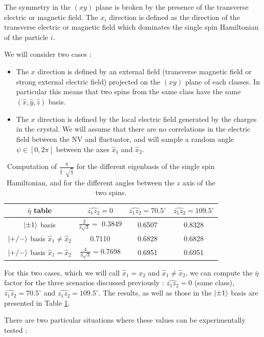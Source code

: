 \documentclass[preprintnumbers,amsmath,amssymb,onecolumn,12pt]{revtex4-2}\usepackage{graphicx}%
\begin{document}
The symmetry in the $(xy)$ plane is broken by the presence of the transverse electric or magnetic field. The $x_i$ direction is defined as the direction of the transverse electric or magnetic field which dominates the single spin Hamiltonian of the particle $i$.

We will consider two cases :
\begin{itemize}
\item The $x$ direction is defined by an external field (transverse magnetic field or strong external electric field) projected on the $(xy)$ plane of each classes. In particular this means that two spins from the same class have the same $(\hat x, \hat y, \hat z)$ basis.
\item The $x$ direction is defined by the local electric field generated by the charges in the crystal. We will assume that there are no correlations in the electric field between the NV and fluctuator, and will sample a random angle $\psi \in [0,2\pi]$ between the axes $\hat{x}_1$ and $\hat{x}_2$.
\end{itemize}

\begin{table}
\begin{tabular}{cccc}
\hline
$\bar{\eta}$ table & $\widehat{z_1 z_2}=0$ & $\widehat{z_1 z_2}=70.5^\circ$ & $\widehat{z_1 z_2}=109.5^\circ$ \\
\hline
$\ket{\pm 1}$ basis & $\frac{2}{3\sqrt{3}}=$ 0.3849 & 0.6507 & 0.8328 \\
$\ket{+/-}$ basis $\hat{x}_1\neq \hat{x}_2$ & 0.7110  & 0.6828 & 0.6828 \\
$\ket{+/-}$ basis $\hat{x}_1= \hat{x}_2$ & $\frac{4}{3\sqrt{3}}=$0.7698  & 0.6951 & 0.6951 \\
\hline
\end{tabular}
\caption{Computation of $\frac{\bar{\eta}}{ \frac{1}{4} \cdot \sqrt{\frac{1}{3}}}$ for the different eigenbasis of the single spin Hamiltonian, and for the different angles between the $z$ axis of the two spins.}
\label{table eta}
\end{table}

For this two cases, which we will call $\hat{x}_1=\hat{x}_2$ and $\hat{x}_1\neq \hat{x}_2$, we can compute the $\bar \eta$ factor for the three scenarios discussed previously : $\widehat{z_1 z_2}=0$ (same class), $\widehat{z_1 z_2}=70.5^\circ$ and $\widehat{z_1 z_2}=109.5^\circ$. The results, as well as those in the $\ket{\pm 1}$ basis are presented in Table \ref{table eta}.

There are two particular situations where these values can be experimentally tested :
\end{document}
